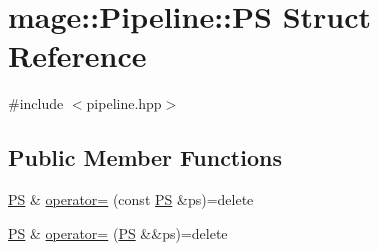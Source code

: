 \hypertarget{structmage_1_1_pipeline_1_1_p_s}{}\section{mage\+:\+:Pipeline\+:\+:PS Struct Reference}
\label{structmage_1_1_pipeline_1_1_p_s}


{\ttfamily \#include $<$pipeline.\+hpp$>$}

\subsection*{Public Member Functions}
\begin{DoxyCompactItemize}
\item 
\hyperlink{structmage_1_1_pipeline_1_1_p_s}{PS} \& \hyperlink{structmage_1_1_pipeline_1_1_p_s_acb199bd38b2b0667a3a427f611c12161}{operator=} (const \hyperlink{structmage_1_1_pipeline_1_1_p_s}{PS} \&ps)=delete
\item 
\hyperlink{structmage_1_1_pipeline_1_1_p_s}{PS} \& \hyperlink{structmage_1_1_pipeline_1_1_p_s_a93e966d5d82fa9dec57f08fcf35cb294}{operator=} (\hyperlink{structmage_1_1_pipeline_1_1_p_s}{PS} \&\&ps)=delete
\end{DoxyCompactItemize}
